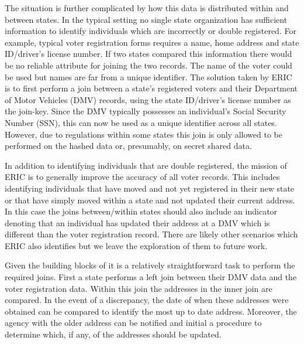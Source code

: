 The situation is further complicated by how this data is distributed within and between states. In the typical setting no single state organization has sufficient information to identify individuals which are incorrectly or double registered. For example, typical voter registration forms requires a name, home address and state ID/driver's license number. If two states compared this information there would be no reliable attribute for joining the two records. The name of the voter could be used but names are far from a unique identifier. The solution taken by ERIC is to first perform a join between a state's registered voters and their Department of Motor Vehicles (DMV) records, using the  state ID/driver's license number as the join-key. Since the DMV typically possesses an individual's Social Security Number (SSN), this can now be used as a unique identifier across all states. However, due to regulations within some states this join is only allowed to be performed on the hashed data or, presumably, on secret shared data.

In addition to identifying individuals that are double registered, the mission of ERIC is to generally improve the accuracy of all voter records. This includes identifying individuals that have moved and not yet registered in their new state or that have simply moved within a state and not updated their current address. In this case the joins between/within states should also include an indicator denoting that an individual has updated their address at a DMV which is different than the voter registration record. There are likely other scenarios which ERIC also identifies but we leave the exploration of them to future work.

Given the building blocks of  it is a relatively straightforward task to perform the required joins. First a state performs a left join between their DMV data and the voter registration data. Within this join the addresses in the inner join are compared. In the event of a discrepancy, the date of when these addresses were obtained can be compared to identify the most up to date address. Moreover, the agency with the older address can be notified and initial a procedure to determine which, if any, of the addresses should be updated. 


